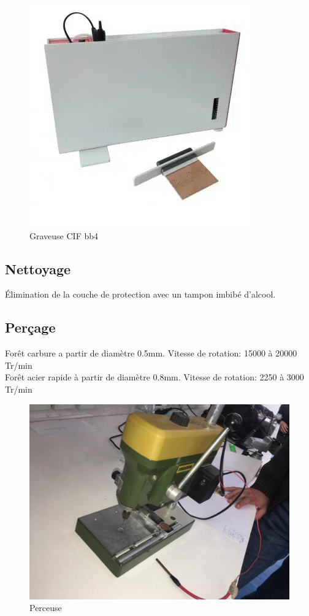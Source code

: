 \begin{figure}[!htbp]
    \centering
    \includegraphics[width=.7\linewidth]{assets/realisation/graveuse.jpg}
    \caption{Graveuse CIF bb4}
\end{figure}

\FloatBarrier

\subsection{Nettoyage}
Élimination de la couche de protection avec un tampon imbibé d'alcool.

\subsection{Perçage}
Forêt carbure a partir de diamètre 0.5mm.
Vitesse de rotation:  15000 à 20000 Tr/min \\
Forêt acier rapide à partir de diamètre 0.8mm.
Vitesse de rotation: 2250 à 3000 Tr/min

\begin{figure}[!htbp]
    \centering
    \includegraphics[width=.7\linewidth]{assets/realisation/x14.jpeg}
    \caption{Perceuse}
\end{figure}

